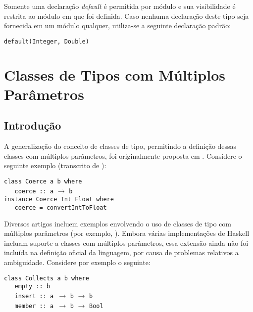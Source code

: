 Somente uma declara\c{c}\~ao \emph{default} \'e permitida por m\'odulo e sua visibilidade \'e restrita 
ao m\'odulo em que foi definida. Caso nenhuma declara\c{c}\~ao deste tipo seja fornecida em um 
m\'odulo qualquer, utiliza-se a seguinte declara\c{c}\~ao padr\~ao:

\begin{center}
  \texttt{default(Integer, Double)}
\end{center}

\section{Classes de Tipos com M\'ultiplos Par\^ametros}\label{mptc}

\subsection{Introdu\c{c}\~ao}

A generaliza\c{c}\~ao do conceito de classes de tipo, permitindo a defini\c{c}\~ao dessas classes com 
m\'ultiplos par\^ametros, foi originalmente proposta em \cite{Wadler89}. Considere o seguinte 
exemplo (transcrito de \cite{Jones00}):

\begin{flushleft}
   \verb|class Coerce a b where|\\
   \verb|   coerce :: a| $\rightarrow$ \verb|b|\\
   \verb|instance Coerce Int Float where|\\
   \verb|   coerce = convertIntToFloat|\\
\end{flushleft}

Diversos artigos incluem exemplos envolvendo o uso de classes de tipo com m\'ultiplos pa\-r\^a\-me\-tros 
(por exemplo, \cite{Jones97Type, Duggan02a}). Embora v\'arias implementa\c{c}\~oes de Haskell incluam suporte a 
classes com m\'ultiplos par\^ametros, essa extens\~ao ainda n\~ao foi inclu\'ida na defini\c{c}\~ao oficial 
da linguagem, por causa de problemas relativos a 
am\-bi\-gui\-da\-de. Considere por exemplo o seguinte:
\begin{flushleft}
   \verb|class Collects a b where|\\
   \verb|   empty :: b|\\
   \verb|   insert :: a |$\rightarrow$ \verb|b| $\rightarrow$ \verb|b|\\
   \verb|   member :: a |$\rightarrow$ \verb|b| $\rightarrow$ \verb|Bool|\\
\end{flushleft}

